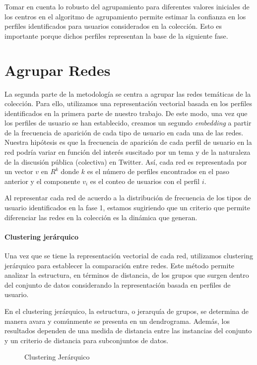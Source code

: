 Tomar en cuenta lo robusto del agrupamiento para diferentes valores iniciales de los centros en el algoritmo de agrupamiento permite estimar la confianza en los perfiles identificados para usuarios considerados en la colección. Esto es importante porque dichos perfiles representan la base de la siguiente fase. 

\section{Agrupar Redes} \label{sec:system:sec3}
La segunda parte de la metodología se centra a agrupar las redes temáticas de la colección. Para ello, utilizamos una representación vectorial basada en los perfiles identificados en la primera parte de nuestro trabajo. De este modo, una vez que los perfiles de usuario se han establecido, creamos un segundo \textit{embedding} a partir de la frecuencia de aparición de cada tipo de usuario en cada una de las redes. 
Nuestra hipótesis es que la frecuencia de aparición de cada perfil de usuario en la red podría variar en función del interés suscitado por un tema y de la naturaleza de la discusión pública (colectiva) en Twitter. Así, cada red es representada por un vector $v$ en ${R}^k$ donde $k$ es el número de perfiles encontrados en el paso anterior y el componente $v_i$ es el conteo de usuarios con el perfil $i$. 

Al representar cada red de acuerdo a la distribución de frecuencia de los tipos de usuario identificados en la fase 1, estamos sugiriendo que un criterio que permite diferenciar las redes en la colección es la dinámica que generan. 

\paragraph{Clustering jerárquico}
Una vez que se tiene la representación vectorial de cada red, utilizamos clustering jerárquico para establecer la comparación entre redes. Este método permite analizar la estructura, en términos de distancia, de los grupos que surgen dentro del conjunto de datos considerando la representación basada en perfiles de usuario. 

En el clustering jerárquico, la estructura, o jerarquía de grupos, se determina de manera avara y comúnmente se presenta en un dendrograma. Además, los resultados dependen de una medida de distancia entre las instancias del conjunto y un criterio de distancia para subconjuntos de datos. 

\begin{figure}[htbp]
  \centering
  
    \caption{Clustering Jerárquico}
    \label{fig:hierarchy}
\end{figure}


